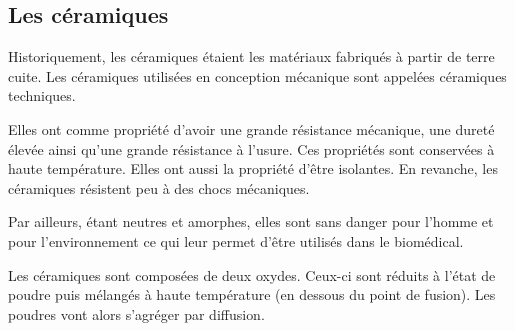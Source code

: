 \documentclass[11pt,oneside]{article}
\begin{document}
\subsection{Les céramiques}

Historiquement, les céramiques étaient les matériaux fabriqués à partir de terre cuite. Les céramiques utilisées en conception mécanique sont appelées céramiques techniques. 

Elles ont comme propriété d'avoir une grande résistance mécanique, une dureté élevée ainsi qu'une grande résistance à l'usure. Ces propriétés sont conservées à haute température. Elles ont aussi la propriété d'être isolantes. En revanche, les céramiques résistent peu à des chocs mécaniques. 

Par ailleurs, étant neutres et amorphes, elles sont sans danger pour l'homme et pour l'environnement ce qui leur permet d'être utilisés dans le biomédical. 


Les céramiques sont composées de deux oxydes. Ceux-ci sont réduits à l'état de poudre puis mélangés à haute température (en dessous du point de fusion). Les poudres vont alors s'agréger par diffusion. 


\begin{thebibliography}{2}


\end{thebibliography}
\end{document}
